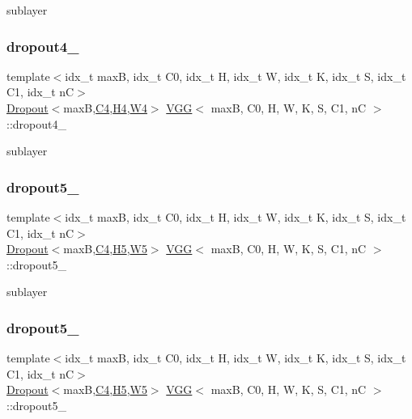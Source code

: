 sublayer \mbox{\label{structVGG_a2309b0f61c5f16e7bb8425ab813e80c6}} 
\subsubsection{\texorpdfstring{dropout4\+\_}{dropout4\_2}}
{\footnotesize\ttfamily template$<$idx\+\_\+t maxB, idx\+\_\+t C0, idx\+\_\+t H, idx\+\_\+t W, idx\+\_\+t K, idx\+\_\+t S, idx\+\_\+t C1, idx\+\_\+t nC$>$ \\
\hyperlink{structDropout}{Dropout}$<$maxB,\hyperlink{structVGG_a4d54a1cc3e99340dfb67e7252719c663}{C4},\hyperlink{structVGG_a1754afced5b0bbb91031179c1f58ee29}{H4},\hyperlink{structVGG_a9728cd3ccfa5011d2a795dff7e9abfe8}{W4}$>$ \hyperlink{structVGG}{V\+GG}$<$ maxB, C0, H, W, K, S, C1, nC $>$\+::dropout4\+\_}

sublayer \mbox{\label{structVGG_ac70005cd3deace7f8d5d8101cc17d43c}} 
\subsubsection{\texorpdfstring{dropout5\+\_}{dropout5\_1}}
{\footnotesize\ttfamily template$<$idx\+\_\+t maxB, idx\+\_\+t C0, idx\+\_\+t H, idx\+\_\+t W, idx\+\_\+t K, idx\+\_\+t S, idx\+\_\+t C1, idx\+\_\+t nC$>$ \\
\hyperlink{structDropout}{Dropout}$<$maxB,\hyperlink{structVGG_a4d54a1cc3e99340dfb67e7252719c663}{C4},\hyperlink{structVGG_a763d01cce59fd355cbcfb7b09c3c8cdc}{H5},\hyperlink{structVGG_a01d04c8b89719716a0c45c3631765875}{W5}$>$ \hyperlink{structVGG}{V\+GG}$<$ maxB, C0, H, W, K, S, C1, nC $>$\+::dropout5\+\_}

sublayer \mbox{\label{structVGG_a10005c43661e059cfebc8e004e7bc344}} 
\subsubsection{\texorpdfstring{dropout5\+\_}{dropout5\_2}}
{\footnotesize\ttfamily template$<$idx\+\_\+t maxB, idx\+\_\+t C0, idx\+\_\+t H, idx\+\_\+t W, idx\+\_\+t K, idx\+\_\+t S, idx\+\_\+t C1, idx\+\_\+t nC$>$ \\
\hyperlink{structDropout}{Dropout}$<$maxB,\hyperlink{structVGG_a4d54a1cc3e99340dfb67e7252719c663}{C4},\hyperlink{structVGG_a763d01cce59fd355cbcfb7b09c3c8cdc}{H5},\hyperlink{structVGG_a01d04c8b89719716a0c45c3631765875}{W5}$>$ \hyperlink{structVGG}{V\+GG}$<$ maxB, C0, H, W, K, S, C1, nC $>$\+::dropout5\+\_}

